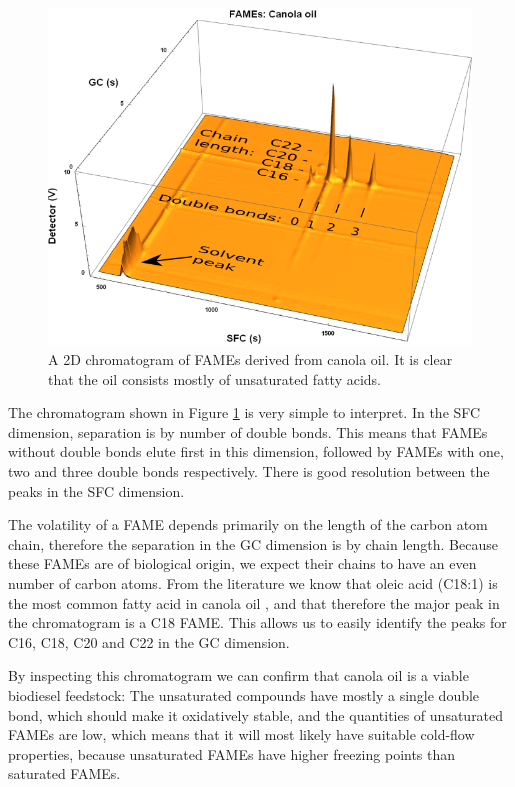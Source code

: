 \begin{figure}
\centering
\includegraphics[width=\textwidth]{Figures/Interpretation.png}
\decoRule

\caption[SFC×GC of canola oil]{A 2D chromatogram of FAMEs derived from
canola oil. It is clear that the oil consists mostly of unsaturated fatty
acids.}

\label{fig:2DCanola}
\end{figure}

The chromatogram shown in Figure \ref{fig:2DCanola} is very simple to interpret.
In the SFC dimension, separation is by number of double bonds.
This means that FAMEs without double bonds elute first in this dimension,
followed by FAMEs with one, two and three double bonds respectively. There is
good resolution between the peaks in the SFC dimension.

The volatility of a FAME depends primarily on the length of the carbon atom
chain, therefore the separation in the GC dimension is by chain length. Because
these FAMEs are of biological origin, we expect their chains to have an even
number of carbon atoms. From the literature we know that oleic acid (C18:1) is
the most common fatty acid in canola oil \autocite{JFAOWHOCAC2019}, and that
therefore the major peak in the chromatogram is a C18 FAME. This allows us to
easily identify the peaks for C16, C18, C20 and C22 in the GC dimension.

By inspecting this chromatogram we can confirm that canola oil is a vi\-able
biodiesel feedstock: The unsaturated compounds have mostly a single double bond,
which should make it oxidatively stable, and the quantities of unsaturated FAMEs
are low, which means that it will most likely have suitable cold-flow
properties, because unsaturated FAMEs have higher freezing points than saturated
FAMEs.

